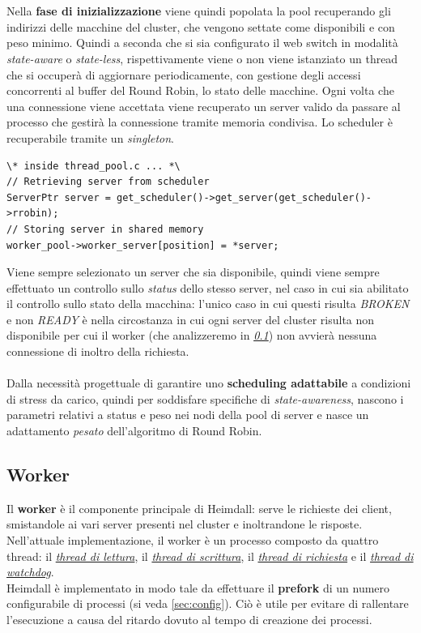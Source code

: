 \documentclass[italian]{tktltiki2}
\begin{document}
\\
\\
Nella \textbf{fase di inizializzazione} viene quindi popolata la pool recuperando gli indirizzi delle macchine del cluster, che vengono settate come disponibili e con peso minimo. Quindi a seconda che si sia configurato il web switch in modalità \emph{state-aware} o \emph{state-less}, rispettivamente viene o non viene istanziato un thread che si occuperà di aggiornare periodicamente, con gestione degli accessi concorrenti al buffer del Round Robin, lo stato delle macchine. Ogni volta che una connessione viene accettata viene recuperato un server valido da passare al processo che gestirà la connessione tramite memoria condivisa. Lo scheduler è recuperabile tramite un \emph{singleton}.
\begin{lstlisting}
\* inside thread_pool.c ... *\
// Retrieving server from scheduler
ServerPtr server = get_scheduler()->get_server(get_scheduler()->rrobin);
// Storing server in shared memory
worker_pool->worker_server[position] = *server;
\end{lstlisting}
Viene sempre selezionato un server che sia disponibile, quindi viene sempre effettuato un controllo sullo \emph{status} dello stesso server, nel caso in cui sia abilitato il controllo sullo stato della macchina: l'unico caso in cui questi risulta \emph{BROKEN} e non \emph{READY} è nella circostanza in cui ogni server del cluster risulta non disponibile per cui il worker (che analizzeremo in \emph{\ref{sec:worker}}) non avvierà nessuna connessione di inoltro della richiesta. 
\\
\\
Dalla necessità progettuale di garantire uno \textbf{scheduling adattabile} a condizioni di stress da carico, quindi per soddisfare specifiche di \emph{state-awareness}, nascono i parametri relativi a status e peso nei nodi della pool di server e nasce un adattamento \emph{pesato} dell'algoritmo di Round Robin. 
\subsection{Worker}
\label{sec:worker}
Il \textbf{worker} è il componente principale di Heimdall: serve le richieste dei client, smistandole ai vari server presenti nel cluster e inoltrandone le risposte.
\\
Nell'attuale implementazione, il worker è un processo composto da quattro thread: il \hyperref[sec:reader]{\emph{thread di lettura}}, il \hyperref[sec:writer]{\emph{thread di scrittura}}, il \hyperref[sec:request]{\emph{thread di richiesta}} e il \hyperref[sec:watchdog]{\emph{thread di watchdog}}.
\\
Heimdall è implementato in modo tale da effettuare il \textbf{prefork} di un numero configurabile di processi (si veda \ref{sec:config}). Ciò è utile per evitare di rallentare l'esecuzione a causa del ritardo dovuto al tempo di creazione dei processi.
\end{document}
